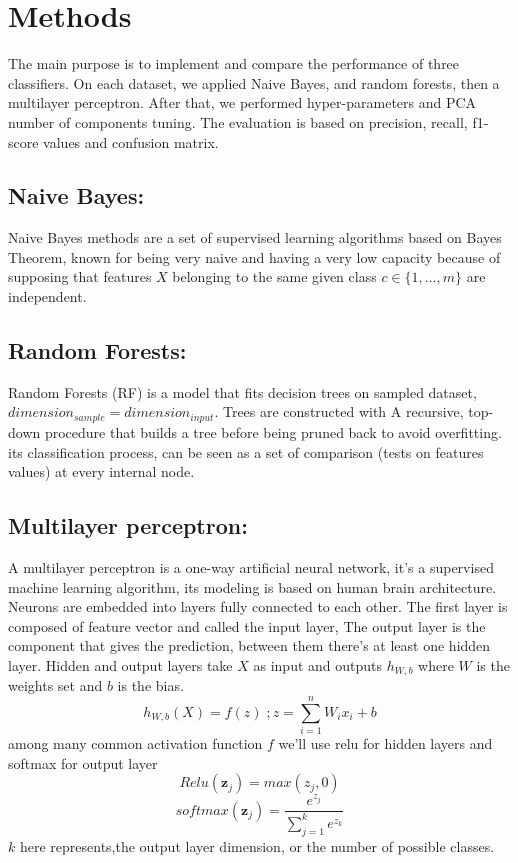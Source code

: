 \documentclass{article}
\begin{document}
\section{Methods}
The main purpose is to implement and compare the performance of three classifiers. On each dataset, we applied Naive Bayes, and random forests, then a multilayer perceptron. After that, we performed hyper-parameters and PCA number of components tuning. The evaluation is based on precision, recall, f1-score values and confusion matrix.
\subsection{Naive Bayes:}
Naive Bayes methods are a set of supervised learning algorithms based on Bayes Theorem, known for being very naive and having a very low capacity because of supposing that features $X$ belonging to the same given class $c\in \{1,\hdots ,m\}$ are independent.


\subsection{Random Forests:}
Random  Forests (RF)  is  a model that fits decision trees on sampled dataset, $dimension_{sample}=dimension_{input}$. Trees are constructed with A recursive, top-down procedure that builds a tree before being pruned back to avoid overfitting.
its classification process, can be seen as a set of comparison (tests on features values) at every internal node.\\


\subsection{Multilayer perceptron:}
A multilayer perceptron is a one-way artificial neural network, it's a supervised machine learning algorithm, its modeling is based on human brain architecture.
Neurons are embedded into layers fully connected to each other. The first layer is composed of feature vector and called the input layer, The output layer is the component that gives the prediction, between them there's at least one hidden layer.
Hidden and output layers take $X$ as input and outputs $h_{W,b}$ where $W$ is the weights set and $b$ is the bias. 
$$h_{W,b}\left(X\right)=f\left(z\right)\; ; z=\sum_{i=1}^{n} W_ix_i+b$$
among many common activation function $f$ we'll use relu for hidden layers and softmax for output layer $$Relu\left(\mathbf{z}_j\right)=max\left(z_j,0\right)$$  
$$softmax\left(\mathbf{z}_j\right) = \frac{e^{z_j}}{\sum_{j=1}^k e^{z_k}}$$  $k$ here represents,the output layer dimension, or the number of possible classes.
\end{document}
